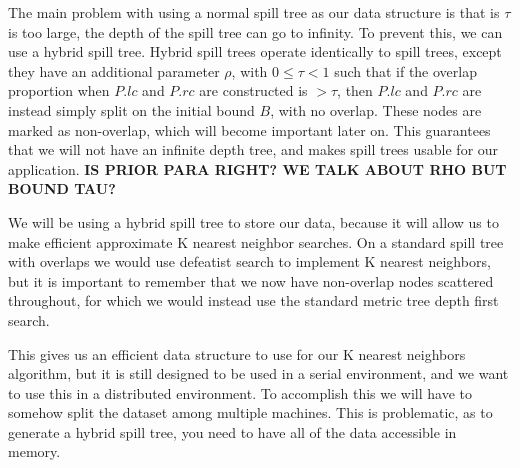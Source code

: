 \vspace{5 mm}
\noindent
The main problem with using a normal spill tree as our data structure is that is
$\tau$ is too large, the depth of the spill tree can go to infinity.  To prevent
this, we can use a hybrid spill tree.  Hybrid spill trees operate identically to
spill trees, except they have an additional parameter $\rho$, with $0 \le \tau <
1$  such that if the overlap proportion when $P.lc$ and $P.rc$ are constructed
is  $> \tau$, then $P.lc$ and $P.rc$ are instead simply split on the initial
bound  $B$, with no overlap.  These nodes are marked as non-overlap, which will
become  important later on.  This guarantees that we will not have an infinite
depth  tree, and makes spill trees usable for our application.
\textbf{IS PRIOR PARA RIGHT? WE TALK ABOUT RHO BUT BOUND TAU?}

\vspace{5 mm}
\noindent
We will be using a hybrid spill tree to store our data, because it will allow us
to make efficient approximate K nearest neighbor searches.  On a standard spill
tree with overlaps we would use defeatist search to implement K nearest
neighbors,  but it is important to remember that we now have non-overlap nodes
scattered  throughout, for which we would instead use the standard metric tree
depth first search.

\vspace{5 mm}
\noindent
This gives us an efficient data structure to use for our K nearest neighbors
algorithm, but it is still designed to be used in a serial environment, and we
want to use this in a distributed environment.  To accomplish this we will have
to somehow split the dataset among multiple machines.  This is problematic, as
to generate a hybrid spill tree, you need to have all of the data accessible in
memory.




